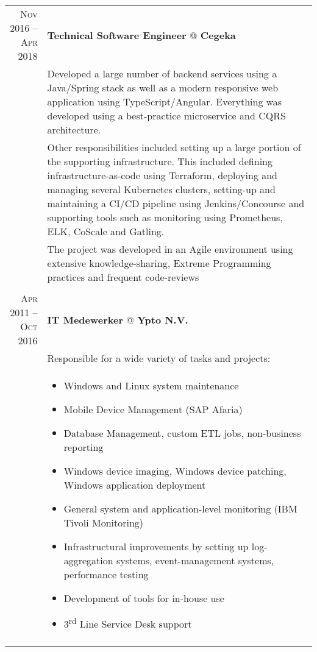 \documentclass[a4paper,10pt]{article}
\begin{document}
\begin{tabular}{r|p{11cm}}
	\textsc{Nov 2016 – Apr 2018} & \textbf{Technical Software Engineer} @ \textbf{Cegeka} \\ 
	& \footnotesize{Developed a large number of backend services using a Java/Spring stack as well as a modern responsive web application using TypeScript/Angular.
	Everything was developed using a best-practice microservice and CQRS architecture.}\\
	& \footnotesize{Other responsibilities included setting up a large portion of the supporting infrastructure.
	This included defining infrastructure-as-code using Terraform, deploying and managing several Kubernetes clusters, setting-up and maintaining a CI/CD pipeline using Jenkins/Concourse and supporting tools such as monitoring using Prometheus, ELK, CoScale and Gatling.}\\
	& \footnotesize{The project was developed in an Agile environment using extensive knowledge-sharing, Extreme Programming practices and frequent code-reviews}\\
	\multicolumn{2}{c}{} \\
	
	\textsc{Apr 2011 – Oct 2016} & \textbf{IT Medewerker} @ \textbf{Ypto N.V.} \\
	& \footnotesize{Responsible for a wide variety of tasks and projects:} \\
	& \begin{minipage} [t] {0.9\textwidth} 
      	\begin{itemize}
      	\item\footnotesize{Windows and Linux system maintenance}
      	\item\footnotesize{Mobile Device Management (SAP Afaria)}
      	\item\footnotesize{Database Management, custom ETL jobs, non-business reporting}
		\item\footnotesize{Windows device imaging, Windows device patching, Windows application deployment}
		\item\footnotesize{General system and application-level monitoring (IBM Tivoli Monitoring)}
		\item\footnotesize{Infrastructural improvements by setting up log-aggregation systems, event-management systems, performance testing}
		\item\footnotesize{Development of tools for in-house use}
		\item\footnotesize{3\textsuperscript{rd} Line Service Desk support}
     	\end{itemize} 
	\end{minipage} \\
	\multicolumn{2}{c}{} \\
\end{tabular}
\end{document}
